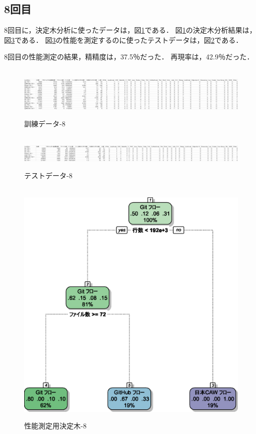 \subsection{8回目}
8回目に，決定木分析に使ったデータは，図\ref{データ8-1}である．
図\ref{データ8-1}の決定木分析結果は，図\ref{決定木8}である．
図\ref{決定木8}の性能を測定するのに使ったテストデータは，図\ref{データ8-2}である．

8回目の性能測定の結果，精精度は，37.5％だった．
再現率は，42.9％だった．

\begin{figure}[H]
\centering　
\includegraphics[width=13cm]{8-1.png}
\caption{訓練データ-8}\label{データ8-1}
\end{figure}
\begin{figure}[H]
\centering　
\includegraphics[width=13cm]{8-2.png}
\caption{テストデータ-8}\label{データ8-2}
\end{figure}
\begin{figure}[H]
\centering　
\includegraphics[width=13cm]{8.eps}
\caption{性能測定用決定木-8}\label{決定木8}
\end{figure}


